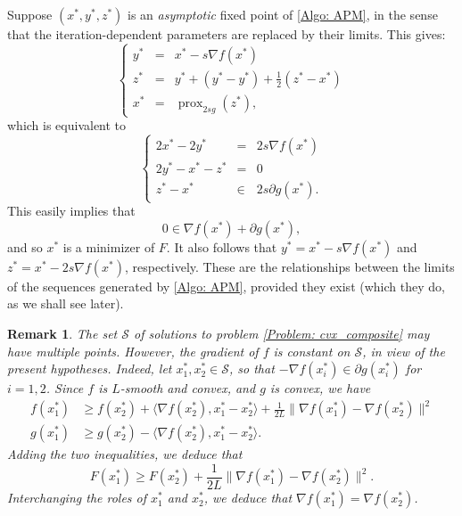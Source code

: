 \documentclass[pdflatex,sn-mathphys-num]{sn-jnl}
\theoremstyle{thmstyleone}
\theoremstyle{thmstyletwo}
\newtheorem{remark}{Remark}
\theoremstyle{thmstylethree}
\DeclareMathOperator{\prox}{prox}
\begin{document}
Suppose $(x^*,y^*,z^*)$ is an {\it asymptotic} fixed point of \eqref{Algo: APM}, in the sense that the iteration-dependent parameters are replaced by their limits. This gives:
$$\left\{
\begin{array}{rcl}
y^* &=& x^* - s \nabla f(x^*) \\
z^* &=& y^* + ( y^* - y^* ) + \frac{1}{2}( z^* - x^* ) \\
x^* &=& \prox_{ 2s g }(z^*),
\end{array} 
\right.
$$
which is equivalent to
$$\left\{
\begin{array}{rcl}
2x^*-2y^* &=&  2s \nabla f(x^*) \\
2y^*-x^*-z^* &=& 0 \\
z^*-x^* &\in& 2s\partial g(x^*).
\end{array} 
\right.
$$
This easily implies that
$$0\in\nabla f(x^*)+\partial g(x^*),$$
and so $x^*$ is a minimizer of $F$. It also follows that $y^*=x^*-s\nabla f(x^*)$ and $z^*=x^*-2s\nabla f(x^*)$, respectively. These are the relationships between the limits of the sequences generated by \eqref{Algo: APM}, provided they exist (which they do, as we shall see later).

\begin{remark} \label{Remark:nablaf_constant}
The set $\mathcal S$ of solutions to problem \eqref{Problem: cvx_composite} may have multiple points. However, the gradient of $f$ is constant on $\mathcal S$, in view of the present hypotheses. Indeed, let $x_1^*,x_2^*\in\mathcal S$, so that $-\nabla f(x_i^*)\in\partial g(x_i^*)$ for $i=1,2$. Since $f$ is $L$-smooth and convex, and $g$ is convex, we have
\begin{align*}
    f(x_1^*) & \ge f(x_2^*)+\langle\nabla f(x_2^*),x_1^*-x_2^*\rangle+\frac{1}{2L}\|\nabla f(x_1^*) -\nabla f(x_2^*)\|^2 \\
    g(x_1^*) & \ge g(x_2^*)-\langle\nabla f(x_2^*),x_1^*-x_2^*\rangle. 
\end{align*}
Adding the two inequalities, we deduce that 
$$F(x_1^*)  \ge F(x_2^*)+\frac{1}{2L}\|\nabla f(x_1^*) -\nabla f(x_2^*)\|^2.$$
Interchanging the roles of $x_1^*$ and $x_2^*$, we deduce that $\nabla f(x_1^*) =\nabla f(x_2^*)$.
\end{remark}




\end{document}
